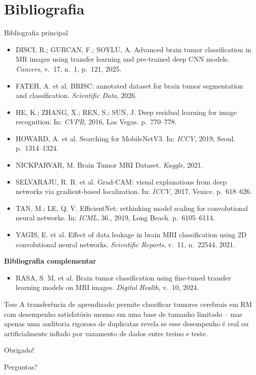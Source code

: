 \documentclass[aspectratio=169]{beamer}
\begin{document}
\section{Bibliografia}
\begin{frame}[allowframebreaks]{Bibliografia principal}
  \footnotesize
  \begin{itemize}
    \item DISCI, R.; GURCAN, F.; SOYLU, A. Advanced brain tumor classification in MR images using transfer learning and pre-trained deep CNN models. \textit{Cancers}, v.~17, n.~1, p.~121, 2025.
    \item FATEH, A. et al. BRISC: annotated dataset for brain tumor segmentation and classification. \textit{Scientific Data}, 2026.
    \item HE, K.; ZHANG, X.; REN, S.; SUN, J. Deep residual learning for image recognition. In: \textit{CVPR}, 2016, Las Vegas. p.~770--778.
    \item HOWARD, A. et al. Searching for MobileNetV3. In: \textit{ICCV}, 2019, Seoul. p.~1314--1324.
    \item NICKPARVAR, M. Brain Tumor MRI Dataset. \textit{Kaggle}, 2021.
    \item SELVARAJU, R. R. et al. Grad-CAM: visual explanations from deep networks via gradient-based localization. In: \textit{ICCV}, 2017, Venice. p.~618--626.
    \item TAN, M.; LE, Q. V. EfficientNet: rethinking model scaling for convolutional neural networks. In: \textit{ICML}, 36., 2019, Long Beach. p.~6105--6114.
    \item YAGIS, E. et al. Effect of data leakage in brain MRI classification using 2D convolutional neural networks. \textit{Scientific Reports}, v.~11, n.~22544, 2021.
  \end{itemize}
  \vspace{6pt}
  \textbf{Bibliografia complementar}
  \begin{itemize}
    \item RASA, S. M. et al. Brain tumor classification using fine-tuned transfer learning models on MRI images. \textit{Digital Health}, v.~10, 2024.
  \end{itemize}
\end{frame}

\begin{frame}
  \centering
  \vfill
  \begin{block}{Tese}
    \centering
    \large A transferência de aprendizado permite classificar tumores cerebrais em RM com desempenho satisfatório mesmo em uma base de tamanho limitado -- mas apenas uma auditoria rigorosa de duplicatas revela se esse desempenho é real ou artificialmente inflado por vazamento de dados entre treino e teste.
  \end{block}
  \vspace{24pt}

  {\Huge Obrigado!}
  \vspace{20pt}

  {\large Perguntas?}
  \vfill
\end{frame}
\end{document}
